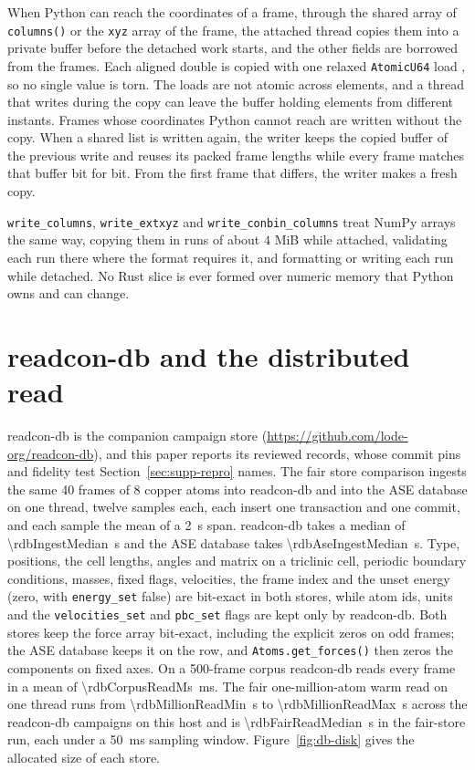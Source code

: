 \documentclass[preprint,12pt]{elsarticle}
\begin{document}
When Python can reach the coordinates of a frame, through the shared array of \texttt{columns()} or the \texttt{xyz} array of the frame, the attached thread copies them into a private buffer before the detached work starts, and the other fields are borrowed from the frames.
Each aligned double is copied with one relaxed \texttt{AtomicU64} load \cite{bosRustAtomicsLocks2023}, so no single value is torn.
The loads are not atomic across elements, and a thread that writes during the copy can leave the buffer holding elements from different instants.
Frames whose coordinates Python cannot reach are written without the copy.
When a shared list is written again, the writer keeps the copied buffer of the previous write and reuses its packed frame lengths while every frame matches that buffer bit for bit.
From the first frame that differs, the writer makes a fresh copy.

\texttt{write\_columns}, \texttt{write\_extxyz} and \texttt{write\_conbin\_columns} treat NumPy arrays the same way, copying them in runs of about \(4\) MiB while attached, validating each run there where the format requires it, and formatting or writing each run while detached.
No Rust slice is ever formed over numeric memory that Python owns and can change.


\FloatBarrier \section{readcon-db and the distributed read}\label{sec:supp-readcon-db}
readcon-db is the companion campaign store (\url{https://github.com/lode-org/readcon-db}), and this paper reports its reviewed records, whose commit pins and fidelity test Section~\ref{sec:supp-repro} names.
The fair store comparison ingests the same 40 frames of 8 copper atoms into readcon-db and into the ASE database on one thread, twelve samples each, each insert one transaction and one commit, and each sample the mean of a 2~s span.
readcon-db takes a median of \num{\rdbIngestMedian}~s and the ASE database takes \num{\rdbAseIngestMedian}~s.
Type, positions, the cell lengths, angles and matrix on a triclinic cell, periodic boundary conditions, masses, fixed flags, velocities, the frame index and the unset energy (zero, with \texttt{energy\_set} false) are bit-exact in both stores, while atom ids, units and the \texttt{velocities\_set} and \texttt{pbc\_set} flags are kept only by readcon-db.
Both stores keep the force array bit-exact, including the explicit zeros on odd frames; the ASE database keeps it on the row, and \texttt{Atoms.get\_forces()} then zeros the components on fixed axes.
On a 500-frame corpus readcon-db reads every frame in a mean of \num{\rdbCorpusReadMs}~ms.
The fair one-million-atom warm read on one thread runs from \num{\rdbMillionReadMin}~s to \num{\rdbMillionReadMax}~s across the readcon-db campaigns on this host and is \num{\rdbFairReadMedian}~s in the fair-store run, each under a 50~ms sampling window.
Figure~\ref{fig:db-disk} gives the allocated size of each store.
\end{document}
